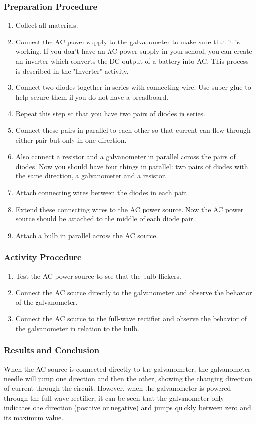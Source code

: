 \subsubsection*{Preparation Procedure}
\begin{enumerate}
\item{Collect all materials.}
\item{Connect the AC power supply to the galvanometer to make sure that it is working.  If you don't have an AC power supply in your school, you can create an inverter which converts the DC output of a battery into AC.  This process is described in the "Inverter" activity.}
\item{Connect two diodes together in series with connecting wire.  Use super glue to help secure them if you do not have a breadboard.}
\item{Repeat this step so that you have two pairs of diodes in series.}
\item{Connect these pairs in parallel to each other so that current can flow through either pair but only in one direction.}
\item{Also connect a resistor and a galvanometer in parallel across the pairs of diodes.  Now you should have four things in parallel: two pairs of diodes with the same direction, a galvanometer and a resistor.}
\item{Attach connecting wires between the diodes in each pair.}
\item{Extend these connecting wires to the AC power source.  Now the AC power source should be attached to the middle of each diode pair.}
\item{Attach a bulb in parallel across the AC source.}
\end{enumerate}

\subsubsection*{Activity Procedure}
\begin{enumerate}
\item{Test the AC power source to see that the bulb flickers.}
\item{Connect the AC source directly to the galvanometer and observe the behavior of the galvanometer.}
\item{Connect the AC source to the full-wave rectifier and observe the behavior of the galvanometer in relation to the bulb.}
\end{enumerate}

\subsubsection*{Results and Conclusion}
When the AC source is connected directly to the galvanometer, the galvanometer needle will jump one direction and then the other, showing the changing direction of current through the circuit.  However, when the galvanometer is powered through the full-wave rectifier, it can be seen that the galvanometer only indicates one direction (positive or negative) and jumps quickly between zero and its maximum value.

